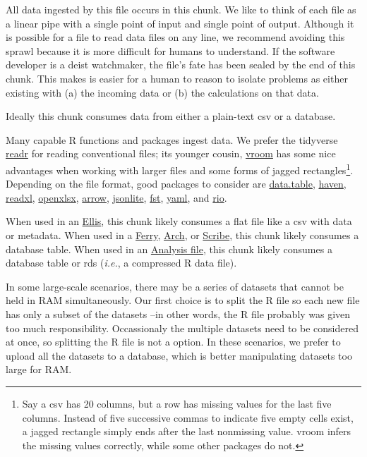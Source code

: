 \documentclass[
]{book}
\begin{document}
All data ingested by this file occurs in this chunk. We like to think of each file as a linear pipe with a single point of input and single point of output. Although it is possible for a file to read data files on any line, we recommend avoiding this sprawl because it is more difficult for humans to understand. If the software developer is a deist watchmaker, the file's fate has been sealed by the end of this chunk. This makes is easier for a human to reason to isolate problems as either existing with (a) the incoming data or (b) the calculations on that data.

Ideally this chunk consumes data from either a plain-text csv or a database.

Many capable R functions and packages ingest data. We prefer the tidyverse \href{https://readr.tidyverse.org/}{readr} for reading conventional files; its younger cousin, \href{https://vroom.r-lib.org/}{vroom} has some nice advantages when working with larger files and some forms of jagged rectangles\footnote{Say a csv has 20 columns, but a row has missing values for the last five columns. Instead of five successive commas to indicate five empty cells exist, a jagged rectangle simply ends after the last nonmissing value. vroom infers the missing values correctly, while some other packages do not.}. Depending on the file format, good packages to consider are \href{https://cran.r-project.org/package=data.table}{data.table}, \href{https://haven.tidyverse.org/}{haven}, \href{https://readxl.tidyverse.org/}{readxl}, \href{https://ycphs.github.io/openxlsx/}{openxlsx}, \href{https://CRAN.R-project.org/package=arrow}{arrow}, \href{https://CRAN.R-project.org/package=jsonlite}{jsonlite}, \href{http://www.fstpackage.org/}{fst}, \href{https://CRAN.R-project.org/package=yaml}{yaml}, and \href{https://cloud.r-project.org/web/packages/rio/vignettes/rio.html}{rio}.

When used in an \protect\hyperlink{pattern-ellis}{Ellis}, this chunk likely consumes a flat file like a csv with data or metadata. When used in a \protect\hyperlink{pattern-ferry}{Ferry}, \protect\hyperlink{pattern-arch}{Arch}, or \protect\hyperlink{pattern-scribe}{Scribe}, this chunk likely consumes a database table. When used in an \protect\hyperlink{pattern-analysis}{Analysis file}, this chunk likely consumes a database table or rds (\emph{i.e.}, a compressed R data file).

In some large-scale scenarios, there may be a series of datasets that cannot be held in RAM simultaneously. Our first choice is to split the R file so each new file has only a subset of the datasets --in other words, the R file probably was given too much responsibility. Occassionaly the multiple datasets need to be considered at once, so splitting the R file is not a option. In these scenarios, we prefer to upload all the datasets to a database, which is better manipulating datasets too large for RAM.
\end{document}
